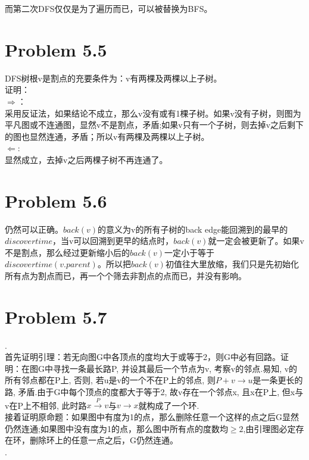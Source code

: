 \documentclass[twocolumn]{ctexart}
\begin{document}
\indent 而第二次DFS仅仅是为了遍历而已，可以被替换为BFS。

\section*{Problem 5.5}
\noindent DFS树根v是割点的充要条件为：v有两棵及两棵以上子树。\\
\noindent 证明：\\
\indent $\Longrightarrow$：\\
\indent 采用反证法，如果结论不成立，那么v没有或有1棵子树。如果v没有子树，则图为平凡图或不连通图，显然v不是割点，矛盾;如果v只有一个子树，则去掉v之后剩下的图也显然连通，矛盾；所以v有两棵及两棵以上子树。\\
\indent $\Longleftarrow$: \\
\indent 显然成立，去掉v之后两棵子树不再连通了。

\section*{Problem 5.6}
\indent 仍然可以正确。$back(v)$的意义为v的所有子树的back edge能回溯到的最早的$discovertime$，当v可以回溯到更早的结点时，$back(v)$就一定会被更新了。如果v不是割点，那么经过更新缩小后的$back(v)$一定小于等于$discovertime(v.parent)$。所以把$back(v)$初值往大里放缩，我们只是先初始化所有点为割点而已，再一个个筛去非割点的点而已，并没有影响。\\


\section*{Problem 5.7}
.\\
\indent 首先证明引理：若无向图G中各顶点的度均大于或等于2，则G中必有回路。证明：在图G中寻找一条最长路P, 并设其最后一个节点为v, 考察v的邻点.易知, v的所有邻点都在P上, 否则, 若u是v的一个不在P上的邻点, 则$P+v\rightarrow u$是一条更长的路, 矛盾.由于G中每个顶点的度都大于等于2, 故v存在一个邻点x, 且x在P上, 但x与v在P上不相邻, 此时路$x\xrightarrow{P}v$与$v\rightarrow x$就构成了一个环.\\
\indent 接着证明原命题：如果图中有度为1的点，那么删除任意一个这样的点之后G显然仍然连通;如果图中没有度为1的点，那么图中所有点的度数均$\ge2$,由引理图必定存在环，删除环上的任意一点之后，G仍然连通。\\
.\\
\begin{center}
\end{center}
\end{document}

